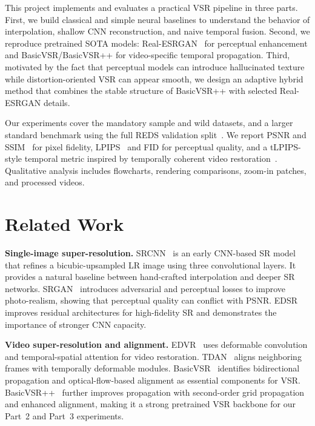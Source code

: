 \documentclass[10pt,twocolumn,letterpaper]{article}
\begin{document}
This project implements and evaluates a practical VSR pipeline in three parts. First, we build classical and simple neural baselines to understand the behavior of interpolation, shallow CNN reconstruction, and naive temporal fusion. Second, we reproduce pretrained SOTA models: Real-ESRGAN~\cite{wang2021realesrgan} for perceptual enhancement and BasicVSR/BasicVSR++ for video-specific temporal propagation. Third, motivated by the fact that perceptual models can introduce hallucinated texture while distortion-oriented VSR can appear smooth, we design an adaptive hybrid method that combines the stable structure of BasicVSR++ with selected Real-ESRGAN details.

Our experiments cover the mandatory sample and wild datasets, and a larger standard benchmark using the full REDS validation split~\cite{nah2019reds}. We report PSNR and SSIM~\cite{wang2004ssim} for pixel fidelity, LPIPS~\cite{zhang2018lpips} and FID for perceptual quality, and a tLPIPS-style temporal metric inspired by temporally coherent video restoration~\cite{chu2020tlpips}. Qualitative analysis includes flowcharts, rendering comparisons, zoom-in patches, and processed videos.

\section{Related Work}
\textbf{Single-image super-resolution.}
SRCNN~\cite{dong2015srcnn} is an early CNN-based SR model that refines a bicubic-upsampled LR image using three convolutional layers. It provides a natural baseline between hand-crafted interpolation and deeper SR networks. SRGAN~\cite{ledig2017srgan} introduces adversarial and perceptual losses to improve photo-realism, showing that perceptual quality can conflict with PSNR. EDSR~\cite{lim2017edsr} improves residual architectures for high-fidelity SR and demonstrates the importance of stronger CNN capacity.

\textbf{Video super-resolution and alignment.}
EDVR~\cite{wang2019edvr} uses deformable convolution and temporal-spatial attention for video restoration. TDAN~\cite{tian2020tdan} aligns neighboring frames with temporally deformable modules. BasicVSR~\cite{chan2021basicvsr} identifies bidirectional propagation and optical-flow-based alignment as essential components for VSR. BasicVSR++~\cite{chan2022basicvsrpp} further improves propagation with second-order grid propagation and enhanced alignment, making it a strong pretrained VSR backbone for our Part~2 and Part~3 experiments.
\end{document}
